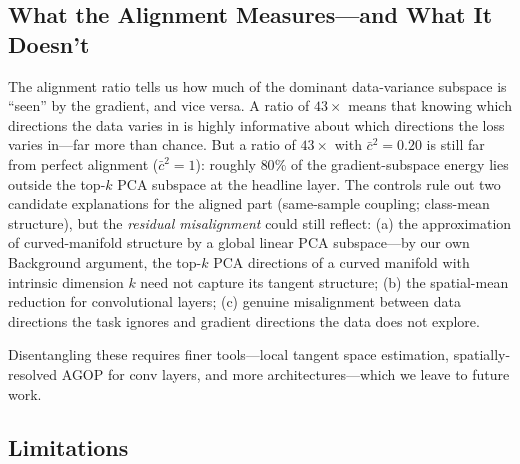 \documentclass{article}
\newcommand{\kcos}{\bar{c}^2}           %
\begin{document}
\subsection{What the Alignment Measures---and What It Doesn't}

The alignment ratio tells us how much of the dominant data-variance
subspace is ``seen'' by the gradient, and vice versa.  A ratio of $43\times$
means that knowing which directions the data varies in is highly informative
about which directions the loss varies in---far more than chance.  But a
ratio of $43\times$ with $\kcos=0.20$ is still far from perfect alignment
($\kcos=1$): roughly $80\%$ of the gradient-subspace energy lies outside the
top-$k$ PCA subspace at the headline layer.  The controls rule out two
candidate explanations for the aligned part (same-sample coupling;
class-mean structure), but the \emph{residual misalignment} could still
reflect: (a) the approximation of curved-manifold structure by a global
linear PCA subspace---by our own Background argument, the top-$k$ PCA
directions of a curved manifold with intrinsic dimension $k$ need not
capture its tangent structure; (b) the spatial-mean reduction for
convolutional layers; (c) genuine misalignment between data directions the
task ignores and gradient directions the data does not explore.

Disentangling these requires finer tools---local tangent space estimation,
spatially-resolved AGOP for conv layers, and more architectures---which we
leave to future work.

\subsection{Limitations}
\end{document}
